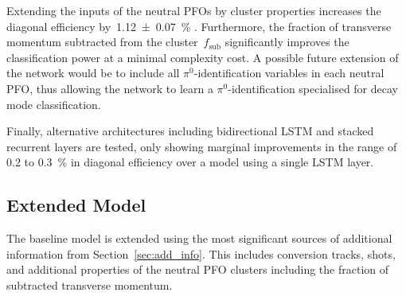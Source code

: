 Extending the inputs of the neutral PFOs by cluster properties increases the
diagonal efficiency by~\SI{1.12 +- 0.07}{\percent} .
Furthermore, the fraction of transverse momentum subtracted from the
cluster~$f_\text{sub}$ significantly improves the classification power at a
minimal complexity cost. A possible future extension of the network would be to
include all $\pi^0$-identification variables in each neutral PFO, thus allowing
the network to learn a $\pi^0$-identification specialised for decay mode
classification.

Finally, alternative architectures including bidirectional LSTM and stacked
recurrent layers are tested, only showing marginal improvements in the range of
\num{0.2} to \SI{0.3}{\percent} in diagonal efficiency over a model using a
single LSTM layer.

\subsection{Extended Model}
\label{sec:extended_model}

The baseline model is extended using the most significant sources of additional
information from Section~\ref{sec:add_info}. This includes conversion tracks,
shots, and additional properties of the neutral PFO clusters including the
fraction of subtracted transverse momentum.


